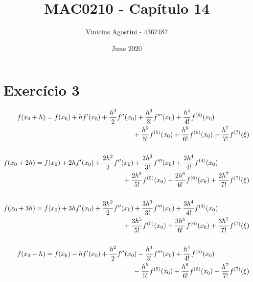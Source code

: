 \documentclass[leqno]{article}
\title{MAC0210 - Capítulo 14}
\author{Vinicius Agostini - 4367487}
\date{June 2020}
\begin{document}
\maketitle

\section*{Exercício 3}


\begin{align*}
    \begin{split}
        f(x_0 + h) {}&= f(x_0) + h f'(x_0) + \frac{h^2}{2} f''(x_0) + \frac{h^3}{3!} f'''(x_0) + \frac{h^4}{4!} f^{(4)}(x_0) \\
        & \hspace{1.8in} + \frac{h^5}{5!} f^{(5)}(x_0) + \frac{h^6}{6!}f^{(6)}(x_0) + \frac{h^7}{7!}f^{(7)}(\xi)
    \end{split}
    \\
    \\
    \begin{split}
        f(x_0 + 2h) {}&= f(x_0) + 2h f'(x_0) + \frac{2h^2}{2} f''(x_0) + \frac{2h^3}{3!} f'''(x_0) + \frac{2h^4}{4!} f^{(4)}(x_0) \\
        & \hspace{1.8in} + \frac{2h^5}{5!} f^{(5)}(x_0) + \frac{2h^6}{6!}f^{(6)}(x_0) + \frac{2h^7}{7!}f^{(7)}(\xi)
    \end{split}
    \\
    \\
    \begin{split}
        f(x_0 + 3h) &= f(x_0) + 3h f'(x_0) + \frac{3h^2}{2} f''(x_0) + \frac{3h^3}{3!} f'''(x_0) + \frac{3h^4}{4!} f^{(4)}(x_0) \\
        & \hspace{1.8in} + \frac{3h^5}{5!} f^{(5)}(x_0) + \frac{3h^6}{6!}f^{(6)}(x_0) + \frac{3h^7}{7!}f^{(7)}(\xi)
    \end{split}
    \\
    \\
    \begin{split}
        f(x_0 - h) &= f(x_0) - h f'(x_0) + \frac{h^2}{2} f''(x_0) - \frac{h^3}{3!} f'''(x_0) + \frac{h^4}{4!} f^{(4)}(x_0) \\
        & \hspace{1.8in} - \frac{h^5}{5!} f^{(5)}(x_0) + \frac{h^6}{6!}f^{(6)}(x_0) - \frac{h^7}{7!}f^{(7)}(\xi)
    \end{split}
    \\
    \\

\end{align*}
\end{document}
